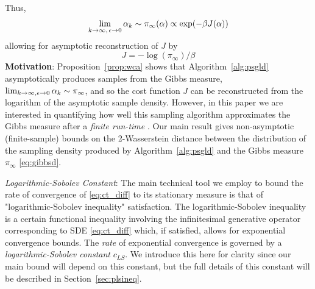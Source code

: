 \documentclass[journal,onecolumn]{IEEEtran}
\newcommand{\alk}{\alpha_k}
\newcommand{\step}{\epsilon}
\newcommand{\rew}{J}
\newcommand{\gibbs}{\ids_{\infty}}
\newcommand{\LSconst}{c_{LS}}
\newcommand{\ids}{\pi}
\begin{document}
Thus,  
\begin{equation}
\label{eq:as_samp}
    \color{black}\lim_{k\to\infty, \, \step \to 0}\alk \sim \gibbs(\alpha) \propto \exp(-\beta\rew(\alpha))
\end{equation} allowing for asymptotic reconstruction of $\rew$ by 
\begin{equation}
    \label{eq:Jrec}
    \rew = -\log(\gibbs)/\beta
\end{equation}
\textbf{Motivation}: 
Proposition~\ref{prop:wca} shows that Algorithm~\ref{alg:psgld} asymptotically produces samples from the Gibbs measure, \\$\color{black}\lim_{k\to\infty,\step \to 0}\alk \sim \gibbs$, and so the cost function $\rew$ can be reconstructed from the logarithm of the asymptotic sample density. However, in this paper we are interested in quantifying how well this sampling algorithm approximates the Gibbs measure after a \textit{finite run-time} \color{black}{and with \textit{non-zero} step size $\step$}. Our main result gives non-asymptotic (finite-sample) bounds on the 2-Wasserstein distance  between the distribution of the sampling density produced by Algorithm~\ref{alg:psgld} and the Gibbs measure $\gibbs$ \eqref{eq:gibbsd}.

{\color{black}\textit{Logarithmic-Sobolev Constant}: The main technical tool we employ to bound the rate of convergence of \eqref{eq:ct_diff} to its stationary measure is that of "logarithmic-Sobolev inequality" satisfaction. The logarithmic-Sobolev inequality is a certain functional inequality involving the infinitesimal generative operator corresponding to SDE \eqref{eq:ct_diff} which, if satisfied, allows for exponential convergence bounds. The \textit{rate} of exponential convergence is governed by a \textit{logarithmic-Sobolev constant} $\LSconst$. We introduce this here for clarity since our main bound will depend on this constant, but the full details of this constant will be described in Section~\ref{sec:plsineq}.}
\end{document}
